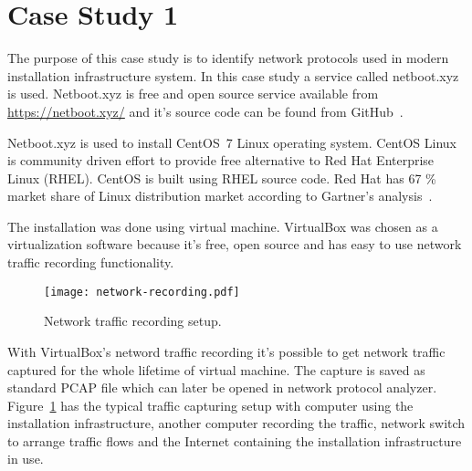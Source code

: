 



\section{Case Study 1}


The purpose of this case study is to identify network protocols used
in modern installation infrastructure system. In this case study a
service called netboot.xyz~\cite{netbootxyz} is used. Netboot.xyz is
free and open source service available from \url{https://netboot.xyz/}
and it's source code can be found from GitHub~\cite{github-netbootxyz}.

Netboot.xyz is used to install CentOS~7 Linux operating system. CentOS
Linux is community driven effort to provide free alternative to Red
Hat Enterprise Linux (RHEL). CentOS is built using RHEL source
code. Red Hat has 67 \% market share of Linux distribution market
according to Gartner's analysis~\cite{gartner-redhat}.



The installation was done using virtual machine. VirtualBox was chosen
as a virtualization software because it's free, open source and has
easy to use network traffic recording functionality.

\begin{figure}[h]
  \texttt{[image: network-recording.pdf]}
  \caption{Network traffic recording setup.\label{fig:network-recording}}
\end{figure}

With VirtualBox's netword traffic recording it's possible to get
network traffic captured for the whole lifetime of virtual
machine. The capture is saved as standard PCAP file which can later be
opened in network protocol
analyzer. Figure~\ref{fig:network-recording} has the typical traffic
capturing setup with computer using the installation infrastructure,
another computer recording the traffic, network switch to arrange
traffic flows and the Internet containing the installation
infrastructure in use.

